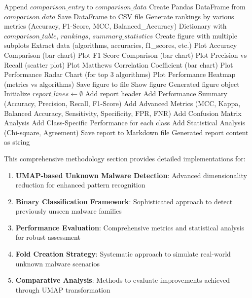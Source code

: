 \begin{algorithm}[!htbp]
\begin{algorithmic}[1]
        \State Append $comparison\_entry$ to $comparison\_data$
    \EndFor
    \State Create Pandas DataFrame from $comparison\_data$
    \State Save DataFrame to CSV file
    \State Generate rankings by various metrics (Accuracy, F1-Score, MCC, Balanced\_Accuracy)
    \Return Dictionary with $comparison\_table$, $rankings$, $summary\_statistics$
\EndProcedure
\Statex
{}
    \State Create figure with multiple subplots
    \State Extract data (algorithms, accuracies, f1\_scores, etc.)
    \State Plot Accuracy Comparison (bar chart)
    \State Plot F1-Score Comparison (bar chart)
    \State Plot Precision vs Recall (scatter plot)
    \State Plot Matthews Correlation Coefficient (bar chart)
    \State Plot Performance Radar Chart (for top 3 algorithms)
    \State Plot Performance Heatmap (metrics vs algorithms)
    \State Save figure to file
    \State Show figure
    \Return Generated figure object
\EndProcedure
\Statex
{}
    \State Initialize $report\_lines \leftarrow \emptyset$
    \State Add report header
    \State Add Performance Summary (Accuracy, Precision, Recall, F1-Score)
    \State Add Advanced Metrics (MCC, Kappa, Balanced Accuracy, Sensitivity, Specificity, FPR, FNR)
    \State Add Confusion Matrix Analysis
    \State Add Class-Specific Performance for each class
    \State Add Statistical Analysis (Chi-square, Agreement)
    \State Save report to Markdown file
    \Return Generated report content as string
\EndProcedure
\end{algorithmic}
\end{algorithm}

This comprehensive methodology section provides detailed implementations for:

\begin{enumerate}
    \item \textbf{UMAP-based Unknown Malware Detection}: Advanced dimensionality reduction for enhanced pattern recognition
    \item \textbf{Binary Classification Framework}: Sophisticated approach to detect previously unseen malware families
    \item \textbf{Performance Evaluation}: Comprehensive metrics and statistical analysis for robust assessment
    \item \textbf{Fold Creation Strategy}: Systematic approach to simulate real-world unknown malware scenarios
    \item \textbf{Comparative Analysis}: Methods to evaluate improvements achieved through UMAP transformation
\end{enumerate}

